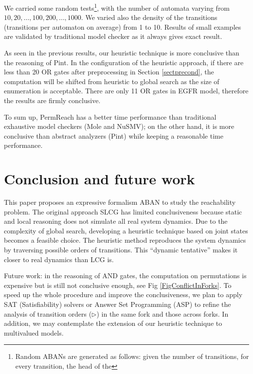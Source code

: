 \documentclass[runningheads]{llncs}
\begin{document}
We carried some random tests\footnote{Random ABANs are generated as follows: given the number of transitions, for every transition, the head of the }, with the number of automata varying from $10,20,\ldots,100,200,\ldots,1000$.
We varied also the density of the transitions (transitions per automaton on average) from 1 to 10.
Results of small examples are validated by traditional model checker as it always gives exact result.

As seen in the previous results, our heuristic technique is more conclusive than the reasoning of Pint. 
In the configuration of the heuristic approach, if there are less than 20 OR gates after preprocessing in Section \ref{sectprecond}, the computation will be shifted from heuristic to global search as the size of enumeration is acceptable.
There are only 11 OR gates in EGFR model, therefore the results are firmly conclusive. 


To sum up, PermReach has a better time performance than traditional exhaustive model checkers (Mole and NuSMV); on the other hand, it is more conclusive than abstract analyzers (Pint) while keeping a reasonable time performance.

\section{Conclusion and future work}\label{sect:6}
This paper proposes an expressive formalism ABAN to study the reachability problem. 
The original approach SLCG has limited conclusiveness because static and local reasoning does not simulate all real system dynamics. 
Due to the complexity of global search, developing a heuristic technique based on joint states becomes a feasible choice.
The heuristic method reproduces the system dynamics by traversing possible orders of transitions. 
This ``dynamic tentative'' makes it closer to real dynamics than LCG is.

Future work: in the reasoning of AND gates, the computation on permutations is expensive but is still not conclusive enough, see Fig \ref{FigConflictInForks}. 
To speed up the whole procedure and improve the conclusiveness, we plan to apply SAT (Satisfiability) solvers or Answer Set Programming (ASP) to refine the analysis of transition orders ($\triangleright$) in the same fork and those across forks. 
In addition, we may contemplate the extension of our heuristic technique to multivalued models.



\end{document}
